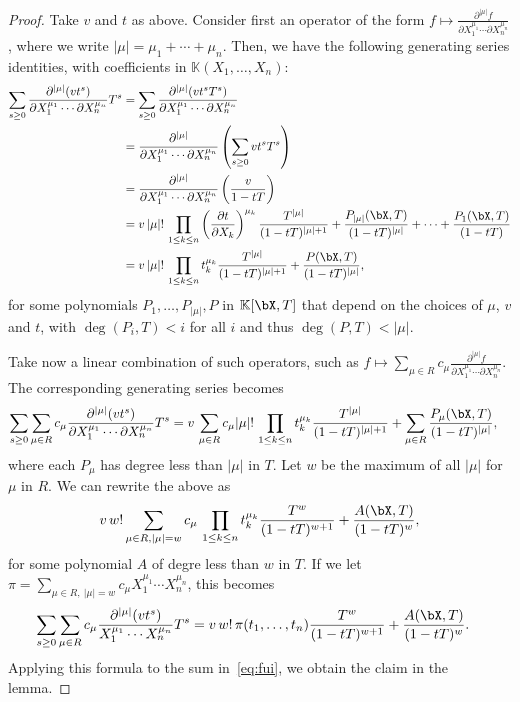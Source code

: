 \documentclass[12pt]{article}
\def\K {\ensuremath{\mathbb{K}}}
\def\K{\mathbb{K}}
\begin{document}
\begin{proof}
	Take $v$ and $t$ as above. Consider first
	an operator of the form $f \mapsto \frac{ \partial^{|\mu|}  f}
	{\partial X_1^{\mu_1} \cdots \partial X_n^{\mu_n}}$, where 
	we write $|\mu|=\mu_1+\cdots+\mu_n$. Then, we have
	the following generating series identities, with coefficients in 
	$\K(X_1,\dots,X_n)$:
	\begin{align*}
	\sum_{s \ge 0} 
	\frac{ \partial^{|\mu|} ( v t^s )} {\partial X_1^{\mu_1} \cdots
		\partial X_n^{\mu_n}}
	T^s 
	&=  \sum_{s \ge 0} 
	\frac{ \partial^{|\mu|} (v t^s T^s)} {\partial X_1^{\mu_1} \cdots
		\partial X_n^{\mu_n}}\\
	&=  
	\frac{ \partial^{|\mu|} } {\partial X_1^{\mu_1} \cdots
		\partial X_n^{\mu_n}}
	\left (\sum_{s \ge 0} v t^s T^s\right ) \\
	&= \frac{ \partial^{|\mu|} } {\partial X_1^{\mu_1} \cdots
		\partial X_n^{\mu_n}}
	\left (\frac v{1-tT} \right ) \\
	&= v\, |\mu|!\, \prod_{1 \le k \le n} 
	\left (\frac{ \partial t} {\partial X_k} \right)^{\mu_k}
	\frac {T^{|\mu|}}{(1-t T)^{|\mu|+1}} + \frac{P_{|\mu|}(\bX,T)}{(1-t T)^{|\mu|}} + \cdots + \frac{P_{1}(\bX,T)}{(1-t T)}\\
	&= v\, |\mu|!\, \prod_{1 \le k \le n} 
	t_k^{\mu_k}
	\frac {T^{|\mu|}}{(1-t T)^{|\mu|+1}} + \frac{P(\bX,T)}{(1-t T)^{|\mu|}},
	\end{align*}
	for some polynomials $P_1,\dots,P_{|\mu|},P$ in $\K[\bX,T]$ that
	depend on the choices of $\mu$, $v$ and $t$, with $\deg(P_i,T) < i$
	for all $i$ and thus $\deg(P,T) < |\mu|$.
	
	Take now a linear combination of such operators, such as 
	$f \mapsto \sum_{\mu \in R} c_\mu \frac{ \partial^{|\mu|}  f } {\partial X_1^{\mu_1} \cdots
		\partial X_n^{\mu_n}}$. The corresponding generating series
	becomes
	\begin{align*}
	\sum_{s \ge 0} 
	\sum_{\mu \in R} c_\mu \frac{ \partial^{|\mu|} ( v t^s )} {\partial X_1^{\mu_1} \cdots
		\partial X_n^{\mu_n}}
	T^s 
	&=
	v\,\sum_{\mu \in R} c_\mu
	|\mu|!\, \prod_{1 \le k \le n} 
	t_k^{\mu_k}
	\frac {T^{|\mu|}}{(1-t T)^{|\mu|+1}} +\sum_{\mu \in R} \frac{P_\mu(\bX,T)}{(1-t T)^{|\mu|}},
	\end{align*}
	where each $P_\mu$ has degree less than $|\mu|$ in $T$.
	Let $w$ be the maximum of all $|\mu|$ for $\mu$ in $R$. We can rewrite 
	the above as
	\begin{align*}
	v\, w! 
	\sum_{\mu \in R, |\mu|=w} c_\mu
	\, \prod_{1 \le k \le n} 
	t_k^{\mu_k}
	\frac {T^{w}}{(1-t T)^{w+1}}
	+ \frac{A(\bX,T)}{(1-t T)^{w}},
	\end{align*}
	for some polynomial $A$ of degre less than $w$ in $T$. If we let 
	$\pi =\sum_{\mu \in R,\ |\mu|=w} c_{\mu} X_1^{\mu_1} \cdots
	X_n^{\mu_n}$, this becomes
	\begin{align*}
	\sum_{s \ge 0} 
	\sum_{\mu \in R} c_\mu \frac{ \partial^{|\mu|} ( v t^s )} { X_1^{\mu_1} \cdots
		X_n^{\mu_n}}
	T^s 
	&=
	v\, w! \,  \pi(t_1,\dots,t_n)
	\frac {T^{w}}{(1-t T)^{w+1}}
	+ \frac{A(\bX,T)}{(1-t T)^{w}}.
	\end{align*}
	Applying this formula to the sum in~\eqref{eq:fui}, we obtain the
	claim in the lemma.
\end{proof}
\end{document}
